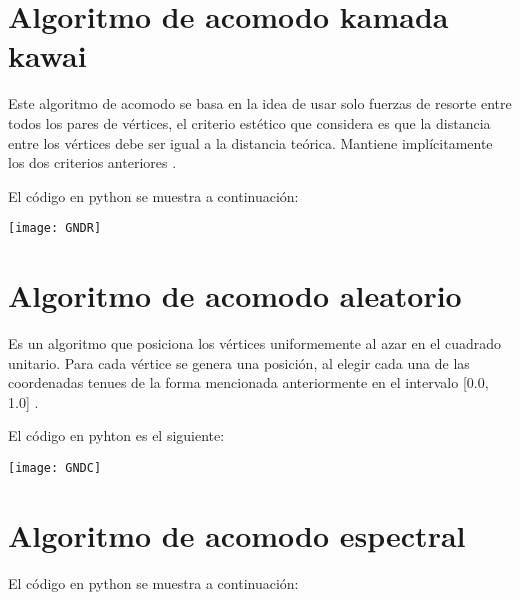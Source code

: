 \documentclass[10pt,a4paper]{article}
\begin{document}
\section{Algoritmo de acomodo kamada kawai}

Este algoritmo de acomodo se basa en la idea de usar solo fuerzas de resorte entre todos los pares de vértices, el criterio estético que considera es que la distancia entre los vértices debe ser igual a la distancia teórica. Mantiene implícitamente los dos criterios anteriores \cite{d}.\newpage

El código en python se muestra a continuación:



\begin{center}

\texttt{[image: GNDR]}

\end{center}

\section{Algoritmo de acomodo aleatorio}

Es un algoritmo que posiciona los vértices uniformemente al azar en el cuadrado unitario. Para cada vértice se genera una posición, al elegir cada una de las coordenadas tenues de la forma mencionada anteriormente en el intervalo [0.0, 1.0] \cite{e}.\vspace{.4cm}

El código en pyhton es el siguiente:



\begin{center}

\texttt{[image: GNDC]}

\end{center}


\section{Algoritmo de acomodo espectral}

El código en python se muestra a continuación:


\end{document}
